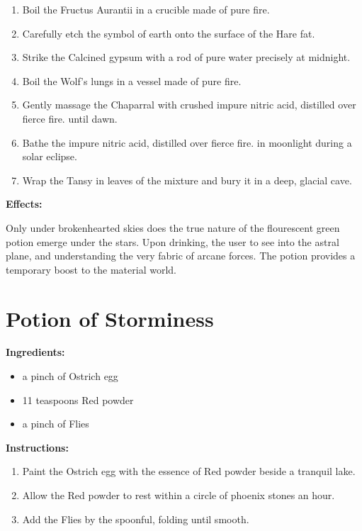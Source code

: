 \documentclass{article}
\begin{document}
\begin{enumerate}
  \item Boil the Fructus Aurantii in a crucible made of pure fire.
  \item Carefully etch the symbol of earth onto the surface of the Hare fat.
  \item Strike the Calcined gypsum with a rod of pure water precisely at midnight.
  \item Boil the Wolf's lungs in a vessel made of pure fire.
  \item Gently massage the Chaparral with crushed impure nitric acid, distilled over fierce fire. until dawn.
  \item Bathe the impure nitric acid, distilled over fierce fire. in moonlight during a solar eclipse.
  \item Wrap the Tansy in leaves of the mixture and bury it in a deep, glacial cave.
\end{enumerate}

\textbf{Effects:}

Only under brokenhearted skies does the true nature of the flourescent green potion emerge under the stars. Upon drinking, the user to see into the astral plane, and understanding the very fabric of arcane forces. The potion provides a temporary boost to the material world.

\newpage
\section*{Potion of Storminess}

\textbf{Ingredients:}

\begin{itemize}
  \item a pinch of Ostrich egg
  \item 11 teaspoons Red powder
  \item a pinch of Flies
\end{itemize}

\textbf{Instructions:}

\begin{enumerate}
  \item Paint the Ostrich egg with the essence of Red powder beside a tranquil lake.
  \item Allow the Red powder to rest within a circle of phoenix stones an hour.
  \item Add the Flies by the spoonful, folding until smooth.
\end{enumerate}
\end{document}
